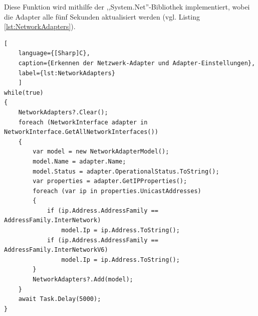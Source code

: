 Diese Funktion wird mithilfe der ,,System.Net''-Bibliothek implementiert, wobei die Adapter alle fünf Sekunden aktualisiert werden (vgl. Listing \ref{lst:NetworkAdapters}).
\begin{lstlisting}[
    language={[Sharp]C},
    caption={Erkennen der Netzwerk-Adapter und Adapter-Einstellungen},
    label={lst:NetworkAdapters}
    ]
while(true)
{ 
    NetworkAdapters?.Clear();
    foreach (NetworkInterface adapter in NetworkInterface.GetAllNetworkInterfaces())
    {
        var model = new NetworkAdapterModel();
        model.Name = adapter.Name;
        model.Status = adapter.OperationalStatus.ToString();
        var properties = adapter.GetIPProperties();
        foreach (var ip in properties.UnicastAddresses)
        {
            if (ip.Address.AddressFamily == AddressFamily.InterNetwork)
                model.Ip = ip.Address.ToString();
            if (ip.Address.AddressFamily == AddressFamily.InterNetworkV6)
                model.Ip = ip.Address.ToString();
        }
        NetworkAdapters?.Add(model);
    }
    await Task.Delay(5000);
}
\end{lstlisting}